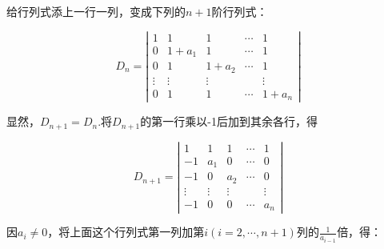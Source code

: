 \begin{solution}
    给行列式添上一行一列，变成下列的$n+1$阶行列式：

$$D_{n}=\left|\begin{array}{ccccccc}
        1      & 1       & 1       & \cdots & 1       \\
        0      & 1+a_{1} & 1       & \cdots & 1       \\
        0      & 1       & 1+a_{2} & \cdots & 1       \\
        \vdots & \vdots  & \vdots  &        & \vdots  \\
        0      & 1       & 1       & \cdots & 1+a_{n}
    \end{array}\right|$$

显然，$D_{n+1}=D_{n}$.将$D_{n+1}$的第一行乘以-1后加到其余各行，得

$$D_{n+1}=\left|\begin{array}{ccccccc}
        1      & 1      & 1      & \cdots & 1      \\
        -1     & a_{1}  & 0      & \cdots & 0      \\
        -1     & 0      & a_{2}  & \cdots & 0      \\
        \vdots & \vdots & \vdots &        & \vdots \\
        -1     & 0      & 0      & \cdots & a_{n}
    \end{array}\right|$$

因$a_{i}\ne 0$，将上面这个行列式第一列加第$i(i=2,\cdots,n+1)$列的$\frac{1}{a_{i-1}}$倍，得：


\end{solution}
